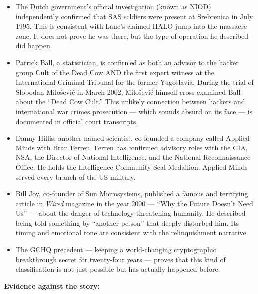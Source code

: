 \begin{itemize}
\item The Dutch government's official investigation (known as NIOD) independently confirmed that SAS soldiers were present at Srebrenica in July 1995. This is consistent with Lane's claimed HALO jump into the massacre zone. It does not prove he was there, but the type of operation he described did happen.
\item Patrick Ball, a statistician, is confirmed as both an advisor to the hacker group Cult of the Dead Cow AND the first expert witness at the International Criminal Tribunal for the former Yugoslavia. During the trial of Slobodan Milošević in March 2002, Milošević himself cross-examined Ball about the ``Dead Cow Cult.'' This unlikely connection between hackers and international war crimes prosecution --- which sounds absurd on its face --- is documented in official court transcripts.
\item Danny Hillis, another named scientist, co-founded a company called Applied Minds with Bran Ferren. Ferren has confirmed advisory roles with the CIA, NSA, the Director of National Intelligence, and the National Reconnaissance Office. He holds the Intelligence Community Seal Medallion. Applied Minds served every branch of the US military.
\item Bill Joy, co-founder of Sun Microsystems, published a famous and terrifying article in \textit{Wired} magazine in the year 2000 --- ``Why the Future Doesn't Need Us'' --- about the danger of technology threatening humanity. He described being told something by ``another person'' that deeply disturbed him. Its timing and emotional tone are consistent with the relinquishment narrative.
\item The GCHQ precedent --- keeping a world-changing cryptographic breakthrough secret for twenty-four years --- proves that this kind of classification is not just possible but has actually happened before.
\end{itemize}

\textbf{Evidence against the story:}

